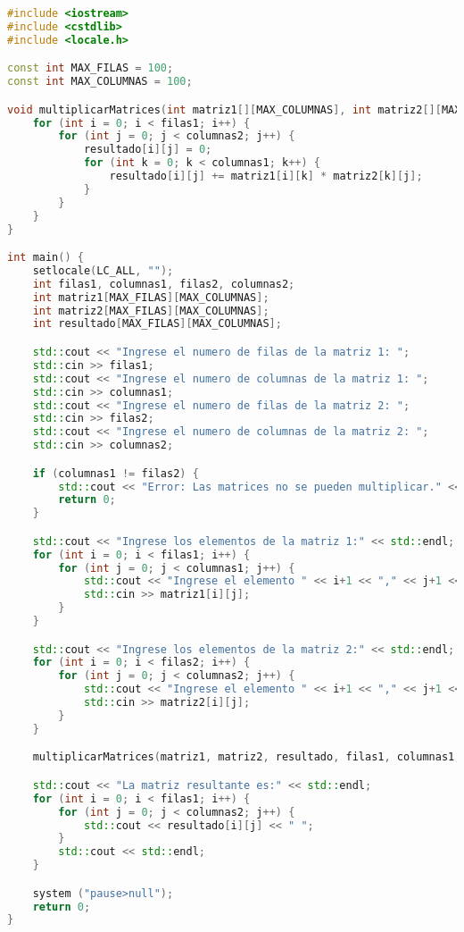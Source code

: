 \noindent
\begin{lstlisting}[language=C++]
#include <iostream>
#include <cstdlib>
#include <locale.h>

const int MAX_FILAS = 100;
const int MAX_COLUMNAS = 100;

void multiplicarMatrices(int matriz1[][MAX_COLUMNAS], int matriz2[][MAX_COLUMNAS], int resultado[][MAX_COLUMNAS], int filas1, int columnas1, int columnas2) {
    for (int i = 0; i < filas1; i++) {
        for (int j = 0; j < columnas2; j++) {
            resultado[i][j] = 0;
            for (int k = 0; k < columnas1; k++) {
                resultado[i][j] += matriz1[i][k] * matriz2[k][j];
            }
        }
    }
}

int main() {
    setlocale(LC_ALL, "");
    int filas1, columnas1, filas2, columnas2;
    int matriz1[MAX_FILAS][MAX_COLUMNAS];
    int matriz2[MAX_FILAS][MAX_COLUMNAS];
    int resultado[MAX_FILAS][MAX_COLUMNAS];

    std::cout << "Ingrese el numero de filas de la matriz 1: ";
    std::cin >> filas1;
    std::cout << "Ingrese el numero de columnas de la matriz 1: ";
    std::cin >> columnas1;
    std::cout << "Ingrese el numero de filas de la matriz 2: ";
    std::cin >> filas2;
    std::cout << "Ingrese el numero de columnas de la matriz 2: ";
    std::cin >> columnas2;

    if (columnas1 != filas2) {
        std::cout << "Error: Las matrices no se pueden multiplicar." << std::endl;
        return 0;
    }

    std::cout << "Ingrese los elementos de la matriz 1:" << std::endl;
    for (int i = 0; i < filas1; i++) {
        for (int j = 0; j < columnas1; j++) {
            std::cout << "Ingrese el elemento " << i+1 << "," << j+1 << ": ";
            std::cin >> matriz1[i][j];
        }
    }

    std::cout << "Ingrese los elementos de la matriz 2:" << std::endl;
    for (int i = 0; i < filas2; i++) {
        for (int j = 0; j < columnas2; j++) {
            std::cout << "Ingrese el elemento " << i+1 << "," << j+1 << ": ";
            std::cin >> matriz2[i][j];
        }
    }

    multiplicarMatrices(matriz1, matriz2, resultado, filas1, columnas1, columnas2);

    std::cout << "La matriz resultante es:" << std::endl;
    for (int i = 0; i < filas1; i++) {
        for (int j = 0; j < columnas2; j++) {
            std::cout << resultado[i][j] << " ";
        }
        std::cout << std::endl;
    }

	system ("pause>null");
	return 0;
}

\end{lstlisting}

